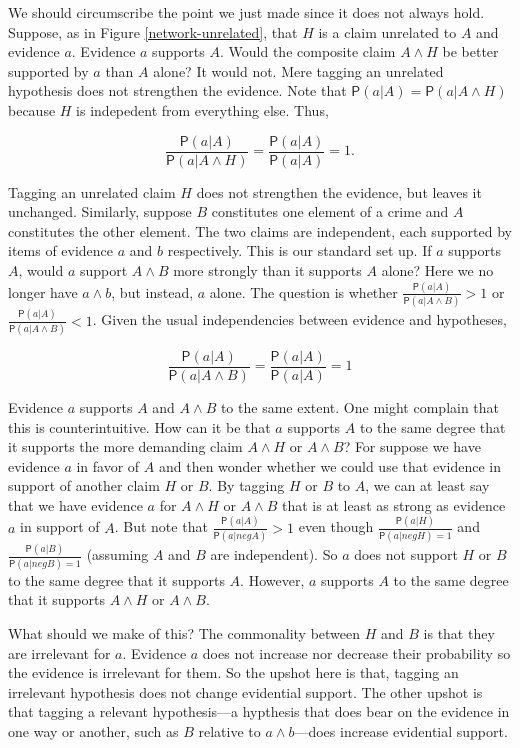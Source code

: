\documentclass[10pt,dvipsnames,enabledeprecatedfontcommands]{scrartcl}
\newcommand{\pr}[1]{\mathsf{P}(#1)}
\begin{document}
We should circumscribe the point we just made since it does not always
hold. Suppose, as in Figure \ref{network-unrelated}, that \(H\) is a
claim unrelated to \(A\) and evidence \(a\). Evidence \(a\) supports
\(A\). Would the composite claim \(A\wedge H\) be better supported by
\(a\) than \(A\) alone? It would not. Mere tagging an unrelated
hypothesis does not strengthen the evidence. Note that
\(\pr{a \vert A}=\pr{a \vert A \wedge H}\) because \(H\) is indepedent
from everything else. Thus,

\[\frac{\pr{a \vert A}}{\pr{a \vert A \wedge H}}=\frac{\pr{a \vert A}}{\pr{a \vert A}}=1.\]

\noindent
Tagging an unrelated claim \(H\) does not strengthen the evidence, but
leaves it unchanged. Similarly, suppose \(B\) constitutes one element of
a crime and \(A\) constitutes the other element. The two claims are
independent, each supported by items of evidence \(a\) and \(b\)
respectively. This is our standard set up. If \(a\) supports \(A\),
would \(a\) support \(A\wedge B\) more strongly than it supports \(A\)
alone? Here we no longer have \(a\wedge b\), but instead, \(a\) alone.
The question is whether
\(\frac{\pr{a \vert A}}{\pr{a \vert A \wedge B}}>1\) or
\(\frac{\pr{a \vert A}}{\pr{a \vert A \wedge B}}<1\). Given the usual
independencies between evidence and hypotheses,

\[\frac{\pr{a\vert A}}{\pr{a \vert A \wedge B}}=\frac{\pr{a \vert A}}{\pr{a \vert A}}=1\]

Evidence \(a\) supports \(A\) and \(A\wedge B\) to the same extent. One
might complain that this is counterintuitive. How can it be that \(a\)
supports \(A\) to the same degree that it supports the more demanding
claim \(A\wedge H\) or \(A\wedge B\)? For suppose we have evidence \(a\)
in favor of \(A\) and then wonder whether we could use that evidence in
support of another claim \(H\) or \(B\). By tagging \(H\) or \(B\) to
\(A\), we can at least say that we have evidence \(a\) for \(A\wedge H\)
or \(A\wedge B\) that is at least as strong as evidence \(a\) in support
of \(A\). But note that \(\frac{\pr{a \vert A}}{\pr{a\vert neg A}}>1\)
even though \(\frac{\pr{a \vert H}}{\pr{a\vert neg H}=1}\) and
\(\frac{\pr{a \vert B}}{\pr{a\vert neg B}=1}\) (assuming \(A\) and \(B\)
are independent). So \(a\) does not support \(H\) or \(B\) to the same
degree that it supports \(A\). However, \(a\) supports \(A\) to the same
degree that it supports \(A\wedge H\) or \(A\wedge B\).

What should we make of this? The commonality between \(H\) and \(B\) is
that they are irrelevant for \(a\). Evidence \(a\) does not increase nor
decrease their probability so the evidence is irrelevant for them. So
the upshot here is that, tagging an irrelevant hypothesis does not
change evidential support. The other upshot is that tagging a relevant
hypothesis---a hypthesis that does bear on the evidence in one way or
another, such as \(B\) relative to \(a\wedge b\)---does increase
evidential support.
\end{document}
